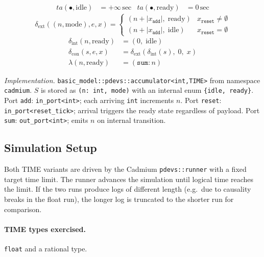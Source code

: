 \begin{align*}
  ta(\bullet,\text{idle})  &= +\infty\,\text{sec}
  & ta(\bullet,\text{ready}) &= 0\,\text{sec}
\end{align*}
\[
  \delta_{\text{ext}}((n, \text{mode}), e, x) =
    \begin{cases}
      (n + |x_{\texttt{add}}|,\; \text{ready}) & x_{\texttt{reset}} \neq \emptyset \\
      (n + |x_{\texttt{add}}|,\; \text{idle})  & x_{\texttt{reset}} = \emptyset
    \end{cases}
\]
\begin{align*}
  \delta_{\text{int}}(n, \text{ready}) &= (0,\; \text{idle}) \\[4pt]
  \delta_{\text{con}}(s, e, x) &=
    \delta_{\text{ext}}\!\left(\delta_{\text{int}}(s),\; 0,\; x\right) \\[4pt]
  \lambda(n, \text{ready}) &= (\texttt{sum}: n)
\end{align*}

\noindent\textit{Implementation.}
\texttt{basic\_model::pdevs::accumulator<int,TIME>}
from namespace \texttt{cadmium}.
$S$ is stored as \texttt{(n:~int,~mode)} with an internal enum
\texttt{\{idle,~ready\}}.
Port \texttt{add}: \texttt{in\_port<int>}; each arriving \texttt{int}
increments $n$.
Port \texttt{reset}: \texttt{in\_port<reset\_tick>}; arrival triggers
the ready state regardless of payload.
Port \texttt{sum}: \texttt{out\_port<int>}; emits $n$ on internal
transition.

\subsection*{Simulation Setup}

Both TIME variants are driven by the Cadmium \texttt{pdevs::runner}
with a fixed target time limit.  The runner advances the simulation
until logical time reaches the limit.  If the two runs produce logs of
different length (e.g.\ due to causality breaks in the float run), the
longer log is truncated to the shorter run for comparison.

\paragraph{TIME types exercised.} \texttt{float} and a rational type.

